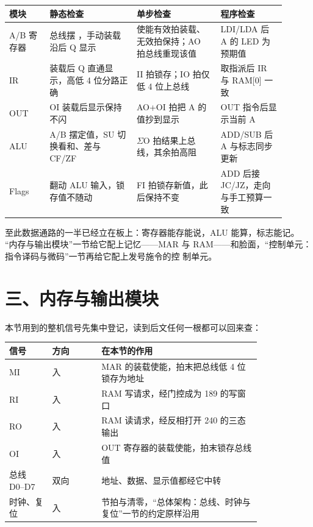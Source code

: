 \begin{longtable}{L{0.13\linewidth}L{0.29\linewidth}L{0.27\linewidth}L{0.21\linewidth}}
\toprule
模块 & 静态检查 & 单步检查 & 程序检查 \\
\midrule
A/B 寄存器 & 总线摆 ，手动装载沿后 Q 显示  & 使能有效拍装载、无效拍保持；AO 拍总线重现该值 & LDI/LDA 后 A 的 LED 为预期值 \\\tablerowrule
IR & 装载后 Q 直通显示，高低 4 位分路正确 & II 拍锁存；IO 拍仅低 4 位上总线 & 取指派后 IR 与 RAM[0] 一致 \\\tablerowrule
OUT & OI 装载后显示保持不闪 & AO+OI 拍把 A 的值抄到显示 & OUT 指令后显示当前 A \\\tablerowrule
ALU & A/B 摆定值，SU 切换看和、差与 CF/ZF & $\Sigma$O 拍结果上总线，其余拍高阻 & ADD/SUB 后 A 与标志同步更新 \\\tablerowrule
Flags & 翻动 ALU 输入，锁存值不随动 & FI 拍锁存新值，此后保持不变 & ADD 后接 JC/JZ，走向与手工预算一致 \\
\bottomrule
\end{longtable}

至此数据通路的一半已经立在板上：寄存器能存能说，ALU 能算，标志能记。
“内存与输出模块”一节给它配上记忆——MAR 与 RAM——和脸面，“控制单元：指令译码与微码”一节再给它配上发号施令的控
制单元。

\section{三、内存与输出模块}

本节用到的整机信号先集中登记，读到后文任何一根都可以回来查：

\begin{longtable}{L{0.14\linewidth}L{0.16\linewidth}L{0.52\linewidth}}
\toprule
信号 & 方向 & 在本节的作用 \\
\midrule
MI & 入 & MAR 的装载使能，拍末把总线低 4 位锁存为地址 \\\tablerowrule
RI & 入 & RAM 写请求，经门控成为 189 的写窗口 \\\tablerowrule
RO & 入 & RAM 读请求，经反相打开 240 的三态输出 \\\tablerowrule
OI & 入 & OUT 寄存器的装载使能，拍末锁存总线值 \\\tablerowrule
总线 D0–D7 & 双向 & 地址、数据、显示值都经它中转 \\\tablerowrule
时钟、复位 & 入 & 节拍与清零，“总体架构：总线、时钟与复位”一节的约定原样沿用 \\
\bottomrule
\end{longtable}

